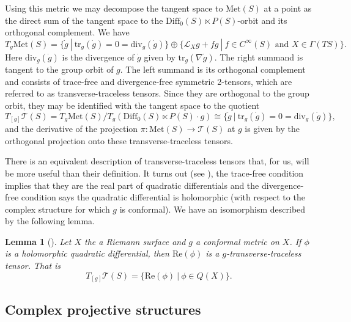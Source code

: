 \documentclass{amsart}
\newtheorem{lem}[thm]{Lemma}
\begin{document}
Using this metric we may decompose the tangent space to $\mathrm{Met}(S)$ at a point as the direct sum of the tangent space to the $\mathrm{Diff}_0(S) \ltimes P(S)$-orbit and its orthogonal complement. 
We have
\[
T_g \mathrm{Met}(S) = \{ \dot{g} \ | \ \mathrm{tr}_g(\dot{g}) = 0 = \mathrm{div}_g(\dot{g})\} \oplus \{ \mathcal{L}_X g + fg \ | \ f \in C^\infty(S) \text{ and } X \in \Gamma(TS) \}.
\]
Here $\mathrm{div}_g(\dot{g})$ is the divergence of $\dot{g}$ given by $\mathrm{tr}_g(\nabla \dot{g})$. 
The right summand is tangent to the group orbit of $g$. 
The left summand is its orthogonal complement and consists of trace-free and divergence-free symmetric 2-tensors, which are referred to as transverse-traceless tensors. 
Since they are orthogonal to the group orbit, they may be identified with the tangent space to the quotient
\[
T_{[g]} \mathcal{T}(S) = T_g \mathrm{Met}(S)/T_g(\mathrm{Diff}_0(S) \ltimes P(S) \cdot g) \cong \{ \dot{g} \ | \ \mathrm{tr}_g(\dot{g}) = 0 = \mathrm{div}_g(\dot{g})\},
\]
and the derivative of the projection $\pi: \mathrm{Met}(S) \to \mathcal{T}(S)$ at $g$ is given by the orthogonal projection onto these transverse-traceless tensors. 

There is an equivalent description of transverse-traceless tensors that, for us, will be more useful than their definition. 
It turns out (see \cite{tromba1992}), the trace-free condition implies that they are the real part of quadratic differentials and the divergence-free condition says the quadratic differential is holomorphic (with respect to the complex structure for which $g$ is conformal). 
We have an isomorphism described by the following lemma.

\begin{lem}[\cite{tromba1992}] \label{tangent-teich}
Let $X$ the a Riemann surface and $g$ a conformal metric on $X$. 
If $\phi$ is a holomorphic quadratic differential, then $\mathrm{Re}(\phi)$ is a $g$-transverse-traceless tensor. 
That is 
\[
T_{[g]}\mathcal{T}(S) = \{\mathrm{Re}(\phi) \ | \ \phi \in Q(X) \}.
\]
\end{lem}



\subsection{Complex projective structures}
\end{document}
